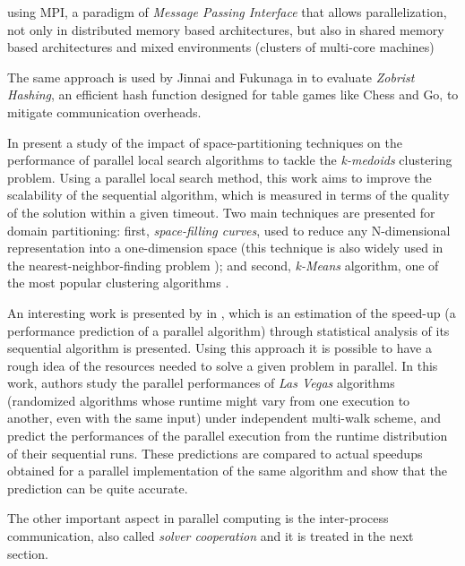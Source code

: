 using MPI, a paradigm of \textit{Message Passing Interface} that allows parallelization, not only in distributed memory based architectures, but also in shared memory based architectures and mixed environments (clusters of multi-core machines) \cite{Grama2003a}

The same approach is used by Jinnai and Fukunaga in \cite{Jinnai} to evaluate \textit{Zobrist Hashing}, an efficient hash function designed for table games like Chess and Go, to mitigate communication overheads.

In \cite{Arbelaez2012}  present a study of the impact of space-partitioning techniques on the performance of parallel local search algorithms to tackle the \textit{k-medoids} clustering problem. Using a parallel local search method, this work aims to improve the scalability of the sequential algorithm, which is measured in terms of the quality of the solution within a given timeout. Two main techniques are presented for domain partitioning: first, {\it space-filling curves}, used to reduce any N-dimensional representation into a one-dimension space (this technique is also widely used in the nearest-neighbor-finding problem \cite{Chen2005}); and second, {\it k-Means} algorithm, one of the most popular clustering algorithms \cite{Berkhin2002}.

An interesting work is presented by  in \cite{Truchet02}, which is an estimation of the speed-up (a performance prediction of a parallel algorithm) through statistical analysis of its sequential algorithm is presented. Using this approach it is possible to have a rough idea of the resources needed to solve a given problem in parallel. In this work, authors study the parallel performances of \textit{Las Vegas} algorithms (randomized algorithms whose runtime might vary from one execution to another, even with the same input) under independent multi-walk scheme, and predict the performances of the parallel execution from the runtime distribution of their sequential runs. These predictions are compared to actual speedups obtained for a parallel implementation of the same algorithm and show that the prediction can be quite accurate.

The other important aspect in parallel computing is the inter-process communication, also called \textit{solver cooperation} and it is treated in the next section.


